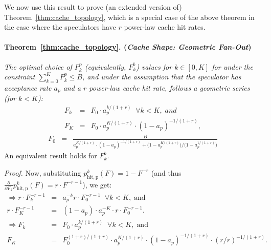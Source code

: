 We now use this result to prove (an extended version of) Theorem~\ref{thm:cache_topology}, which is a special case of the above theorem in the case where the speculators have $r$ power-law cache hit rates.

\paragraph{Theorem~\ref{thm:cache_topology}. (\textit{\Sys Cache Shape: Geometric Fan-Out})}
\label{thm:cache_topology_app}
\textit{The optimal choice of $F_k^p$ (equivalently, $F_k^b$) values for $k\in [0,K]$ for \Sys under the constraint $\sum_{k=0}^K F_k^p \leq B$, and under the assumption that the speculator has acceptance rate $a_p$ and a $r$ power-law cache hit rate, follows a geometric series (for $k < K$):}
\begin{eqnarray*}
F_k &=& F_0 \cdot a_p^{k/(1 + r)}  \;\; \forall k < K, \; \textit{and} \\
F_K &=& F_0 \cdot a_p^{K/(1 + r)} \cdot (1-a_p)^{-1/(1 + r)},
\end{eqnarray*}
\begin{eqnarray*}
    F_0 &=& \frac{B}{a_p^{K/(1 + r)} \cdot (1-a_p)^{-1/(1 + r)} +  \Big(1-a_p^{K/(1 + r)}\Big)/\Big( 1-a_p^{1/(1 + r)}\Big)} 
\end{eqnarray*}
An equivalent result holds for $F_k^b$.


\textit{Proof.} Now, substituting $p_{\mathrm{hit,p}}^k(F) = 1 - F^{-r}$ (and thus $\frac{\partial }{\partial F_k} p_{\mathrm{hit,p}}^k(F) = r \cdot F^{-r-1}$),  we get:
\begin{eqnarray*}
\Rightarrow r \cdot F_k^{-r-1} &=& a_p^{-k}r \cdot F_0^{-r-1} \;\; \forall k < K, \; \text{and} \\
r \cdot F_K^{-r-1} &=& (1-a_p) \cdot a_p^{-K} \cdot r \cdot F_0^{-r-1}. \\
\Rightarrow F_k &=& F_0 \cdot a_p^{k/(1 + r)}  \;\; \forall k < K, \; \text{and} \\
F_K &=& F_0^{(1+r)/(1+r)} \cdot a_p^{K/(1 + r)} \cdot (1-a_p)^{-1/(1 + r)} \cdot (r/r)^{-1/(1+r)}.
\end{eqnarray*}

